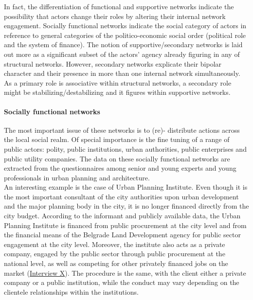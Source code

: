 \documentclass[11pt]{report}
\begin{document}
In fact, the differentiation of functional and supportive networks indicate the possibility that actors change their roles by altering their internal network engagement. Socially functional networks indicate the social category of actors in reference to general categories of the politico-economic social order (political role and the system of finance). The notion of supportive/secondary networks is laid out more as a significant subset of the actors’ agency already figuring in any of structural networks. However, secondary networks explicate their bipolar character and their presence in more than one internal network simultaneously. As a primary role is associative within structural networks, a secondary role might be stabilizing/destabilizing and it figures within supportive networks. 

\paragraph{Socially functional networks}

The most important issue of these networks is to (re)- distribute actions across the local social realm. Of special importance is the fine tuning of a range of public actors: polity, public institutions, urban authorities, public enterprises and public utility companies. The data on these socially functional networks are extracted from the questionnaires among senior and young experts and young professionals in urban planning and architecture. 
\\

An interesting example is the case of Urban Planning Institute. Even though it is the most important consultant of the city authorities upon urban development and the major planning body in the city, it is no longer financed directly from the city budget. According to the informant and publicly available data, the Urban Planning Institute is financed from public procurement at the city level and from the financial means of the Belgrade Land Development agency for public sector engagement at the city level. Moreover, the institute also acts as a private company, engaged by the public sector through public procurement at the national level, as well as competing for other privately financed jobs on the market (\href{InterviewX}{Interview X}).
The procedure is the same, with the client either a private company or a public institution, while the conduct may vary depending on the clientele relationships within the institutions.
\\
\end{document}
